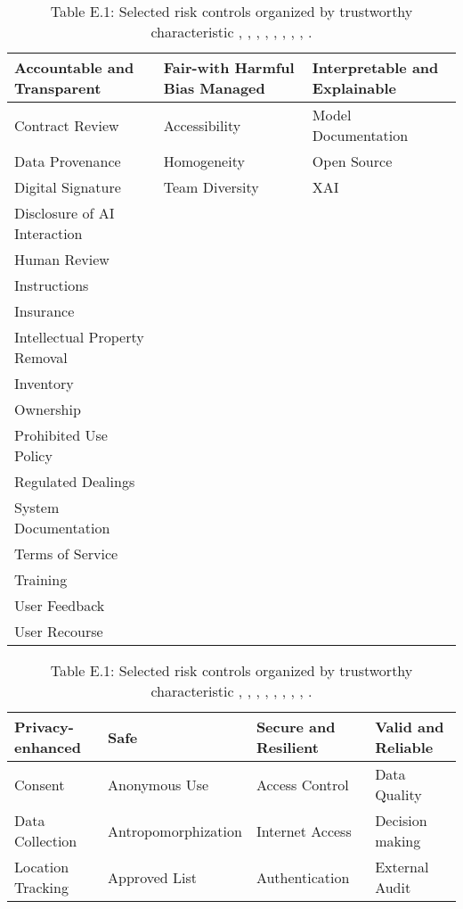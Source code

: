 \documentclass[fleqn]{article}
\begin{document}
\begin{table}[H]
	\caption*{Table E.1: Selected risk controls organized by trustworthy characteristic \cite{airmf}, \cite{playbook}, \cite{ai600-1}, \cite{iso42001}, \cite{mcgraw2024architectural}, \cite{mcgraw2020architectural}, \cite{msft_rai_std}, \cite{uk_ai_safety}, \cite{occ_mrm}.}
	\label{tab:controls_by_tc}
	\footnotesize
	\begin{tabular}{lll}
		\toprule
		\textbf{Accountable and Transparent} & \textbf{Fair-with Harmful Bias Managed} & \textbf{Interpretable and Explainable} \\
		\midrule
		Contract Review & Accessibility & Model Documentation \\
		Data Provenance & Homogeneity & Open Source \\
		Digital Signature & Team Diversity & XAI \\
		Disclosure of AI Interaction & & \\
		Human Review  & & \\
		Instructions & & \\
		Insurance & & \\
		Intellectual Property Removal & & \\
		Inventory & & \\
		Ownership & & \\
		Prohibited Use Policy & & \\
		Regulated Dealings & & \\
		System Documentation & & \\
		Terms of Service & & \\
		Training  & & \\
		User Feedback & & \\
		User Recourse & & \\
		\bottomrule
	\end{tabular}
	\newline
	\vspace{10pt}
	\newline	
	\begin{tabular}{llll}
		\toprule
		\textbf{Privacy-enhanced} & \textbf{Safe} & \textbf{Secure and Resilient} & \textbf{Valid and Reliable} \\
		\midrule
		Consent & Anonymous Use & Access Control  & Data Quality \\
		Data Collection & Antropomorphization  & Internet Access & Decision making  \\
		Location Tracking & Approved List & Authentication  & External Audit \\

\end{tabular}
\end{table}
\end{document}
